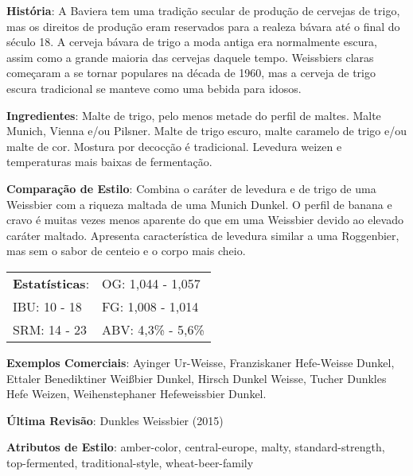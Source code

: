 \textbf{História}: A Baviera tem uma tradição secular de produção de cervejas de trigo, mas os direitos de produção eram reservados para a realeza bávara até o final do século 18. A cerveja bávara de trigo a moda antiga era normalmente escura, assim como a grande maioria das cervejas daquele tempo. Weissbiers claras começaram a se tornar populares na década de 1960, mas a cerveja de trigo escura tradicional se manteve como uma bebida para idosos.

\textbf{Ingredientes}: Malte de trigo, pelo menos metade do perfil de maltes. Malte Munich, Vienna e/ou Pilsner. Malte de trigo escuro, malte caramelo de trigo e/ou malte de cor. Mostura por decocção é tradicional. Levedura weizen e temperaturas mais baixas de fermentação.

\textbf{Comparação de Estilo}: Combina o caráter de levedura e de trigo de uma Weissbier com a riqueza maltada de uma Munich Dunkel. O perfil de banana e cravo é muitas vezes menos aparente do que em uma Weissbier devido ao elevado caráter maltado. Apresenta característica de levedura similar a uma Roggenbier, mas sem o sabor de centeio e o corpo mais cheio.

\begin{tabular}{@{}p{35mm}p{35mm}@{}}
  \textbf{Estatísticas}: & OG: 1,044 - 1,057 \\
  IBU: 10 - 18 & FG: 1,008 - 1,014 \\
  SRM: 14 - 23 & ABV: 4,3\% - 5,6\%
\end{tabular}

\textbf{Exemplos Comerciais}: Ayinger Ur-Weisse, Franziskaner Hefe-Weisse Dunkel, Ettaler Benediktiner Weißbier Dunkel, Hirsch Dunkel Weisse, Tucher Dunkles Hefe Weizen, Weihenstephaner Hefeweissbier Dunkel.

\textbf{Última Revisão}: Dunkles Weissbier (2015)

\textbf{Atributos de Estilo}: amber-color, central-europe, malty, standard-strength, top-fermented, traditional-style, wheat-beer-family
